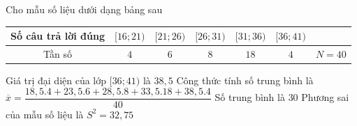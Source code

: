 \begin{vd}%
    Cho mẫu số liệu dưới dạng bảng sau
    \begin{center}
        \begin{tabular}{|c|c|c|c|c|c|c|}
            \hline
            Số câu trả lời đúng & $[16;21)$ & $[21;26)$ & $[26;31)$ & $[31;36)$ & $[36;41)$ & \\
            \hline
            Tần số & $4$ & $6$ & $8$ & $18$ & $4$ & $N = 40$ \\
            \hline
        \end{tabular}
    \end{center}
    \choiceTF
    {\True Giá trị đại diện của lớp $[36;41)$ là $38,5$}
    {\True Công thức tính số trung bình là $\overline{x} = \dfrac{18,5.4 + 23,5.6 + 28,5.8 + 33,5.18 + 38,5.4}{40}$}
    {\True Số trung bình là $30$}
    {\True Phương sai của mẫu số liệu là $S^2 = 32,75$}
\end{vd}
